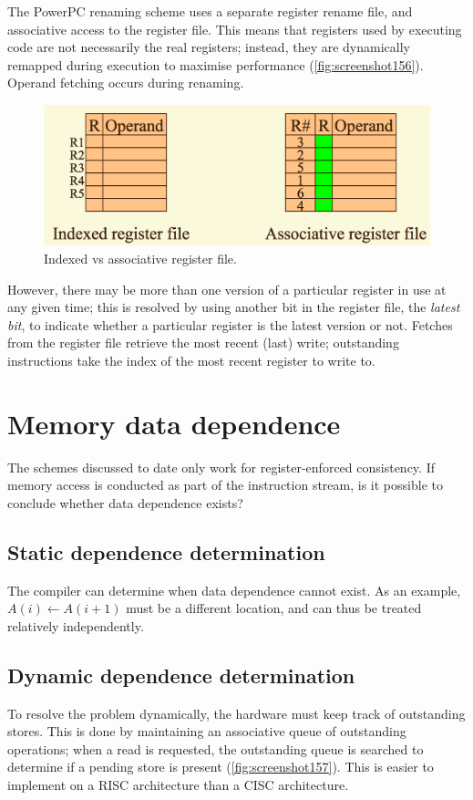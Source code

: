 The PowerPC renaming scheme uses a separate register rename file, and associative access to the register file. This means that registers used by executing code are not necessarily the real registers; instead, they are dynamically remapped during execution to maximise performance (\autoref{fig:screenshot156}). Operand fetching occurs during renaming. 

\begin{figure}
\centering
\includegraphics[width=0.7\linewidth]{figures/screenshot156}
\caption{Indexed vs associative register file.}
\label{fig:screenshot156}
\end{figure}

However, there may be more than one version of a particular register in use at any given time; this is resolved by using another bit in the register file, the \textit{latest bit}, to indicate whether a particular register is the latest version or not. Fetches from the register file retrieve the most recent (last) write; outstanding instructions take the index of the most recent register to write to.

\section{Memory data dependence}
The schemes discussed to date only work for register-enforced consistency. If memory access is conducted as part of the instruction stream, is it possible to conclude whether data dependence exists?

\subsection{Static dependence determination}
The compiler can determine when data dependence cannot exist. As an example, $A(i) \gets A(i+1)$ must be a different location, and can thus be treated relatively independently.

\subsection{Dynamic dependence determination}
To resolve the problem dynamically, the hardware must keep track of outstanding stores. This is done by maintaining an associative queue of outstanding operations; when a read is requested, the outstanding queue is searched to determine if a pending store is present (\autoref{fig:screenshot157}). This is easier to implement on a RISC architecture than a CISC architecture.

